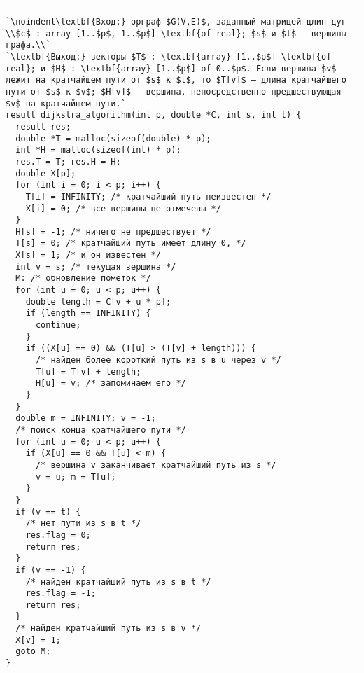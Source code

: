 \vspace{5pt} \hrule
\begin{lstlisting}[caption={Алгоритм Дейкстры}, label=p286_dijkstra_1, escapechar=`]
`\noindent\textbf{Вход:} орграф $G(V,E)$, заданный матрицей длин дуг \\$c$ : array [1..$p$, 1..$p$] \textbf{of real}; $s$ и $t$ — вершины графа.\\`
`\textbf{Выход:} векторы $T$ : \textbf{array} [1..$p$] \textbf{of real}; и $H$ : \textbf{array} [1..$p$] of 0..$p$. Если вершина $v$ лежит на кратчайшем пути от $s$ к $t$, то $T[v]$ — длина кратчайшего пути от $s$ к $v$; $H[v]$ — вершина, непосредственно предшествующая $v$ на кратчайшем пути.`
result dijkstra_algorithm(int p, double *C, int s, int t) {
  result res;
  double *T = malloc(sizeof(double) * p);
  int *H = malloc(sizeof(int) * p);
  res.T = T; res.H = H;
  double X[p];
  for (int i = 0; i < p; i++) {
    T[i] = INFINITY; /* кратчайший путь неизвестен */
    X[i] = 0; /* все вершины не отмечены */
  }
  H[s] = -1; /* ничего не предшествует */
  T[s] = 0; /* кратчайший путь имеет длину 0, */
  X[s] = 1; /* и он известен */
  int v = s; /* текущая вершина */
  M: /* обновление пометок */
  for (int u = 0; u < p; u++) {
    double length = C[v + u * p];
    if (length == INFINITY) {
      continue;
    }
    if ((X[u] == 0) && (T[u] > (T[v] + length))) {
      /* найден более короткий путь из s в u через v */
      T[u] = T[v] + length;
      H[u] = v; /* запоминаем его */
    }
  }
  double m = INFINITY; v = -1;
  /* поиск конца кратчайшего пути */
  for (int u = 0; u < p; u++) {
    if (X[u] == 0 && T[u] < m) {
      /* вершина v заканчивает кратчайший путь из s */
      v = u; m = T[u];
    }
  }
  if (v == t) {
    /* нет пути из s в t */
    res.flag = 0;
    return res;
  }
  if (v == -1) {
    /* найден кратчайший путь из s в t */
    res.flag = -1;
    return res;
  }
  /* найден кратчайший путь из s в v */
  X[v] = 1;
  goto M;
}
\end{lstlisting}
